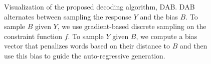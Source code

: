 \begin{figure}[t]
    \centering
    \resizebox{12 cm}{!}{
        
        }
    \caption{Visualization of the proposed decoding algorithm, DAB. DAB alternates between sampling the response $Y$ and the bias $B$. To sample $B$ given $Y$, we use gradient-based discrete sampling on the constraint function $f$. To sample $Y$ given $B$, we compute a bias vector that penalizes words based on their distance to $B$ and then use this bias to guide the auto-regressive generation.
}
\label{fig:diagram}
\end{figure}